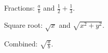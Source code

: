 Fractions: $\frac{a}{b}$ and $\frac{1}{2} + \frac{1}{3}$.

Square root: $\sqrt{x}$ and $\sqrt{x^2 + y^2}$.

Combined: $\sqrt{\frac{a}{b}}$.
